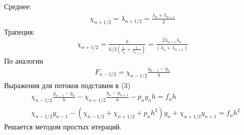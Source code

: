 \documentclass[12pt,a4paper]{article}
\begin{document}
	Среднее:
	\begin{align*}
	\chi_{n+1/2} = \lambda_{n+1/2} = \frac{\lambda_n + \lambda_{n+1}}{2}
	\end{align*}
	Трапеция:
	\begin{align*}
	\chi_{n+1/2} = \frac{h}{h/2 \left(\frac{1}{\lambda_n} + \frac{1}{\lambda_{n+1}}\right)} = \frac{2\lambda_{n+1} \lambda_n}{(\lambda_n+\lambda_{n+1})}
	\end{align*}
	По аналогии
	\begin{align*}
	F_{n-1/2} = \chi_{n-1/2}\frac{y_{n-1} - y_n}{h}
	\end{align*}
	Выражения для потоков подставим в (3)
	\begin{align*}
	&\chi_{n-1/2}\frac{y_{n-1} - y_n}{h} - \chi_{n+1/2}\frac{y_n - y_{n+1}}{h} - p_n y_n h = f_n h \\
	&\chi_{n-1/2} y_{n-1} - (\chi_{n-1/2} + \chi_{n+1/2} + p_n h^2)y_n +  \chi_{n+1/2}y_{n+1} = f_n h^2
	\end{align*}
	Решается методом простых итераций.\\
	
\end{document}
